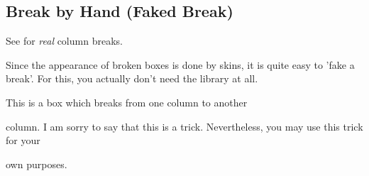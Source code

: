 \clearpage
\subsection{Break by Hand (Faked Break)}

\begin{marker}
See  for \emph{real} column breaks.
\end{marker}

Since the appearance of broken boxes is done by skins, it is quite easy
to 'fake a break'. For this, you actually don't need the
 library at
all.

\begin{dispExample}
%
\begin{tcolorbox}[title=My broken box,skin=enhancedfirst]
This is a box which breaks from one column to another
\end{tcolorbox}\hfill
\begin{tcolorbox}[skin=enhancedmiddle]
column. I am sorry to say that this is a trick.
Nevertheless, you may use this trick for your
\end{tcolorbox}\hfill
\begin{tcolorbox}[skin=enhancedlast]
own purposes.
\end{tcolorbox}
\end{dispExample}


